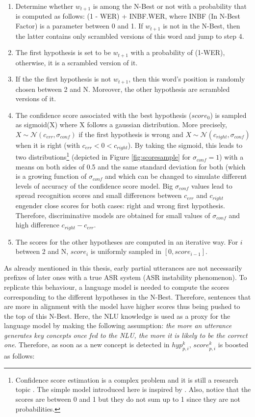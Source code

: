 					\begin{enumerate}
						\item Determine whether $w_{t+1}$ is among the N-Best or not with a probability that is computed as follows: (1 - WER) + INBF.WER, where INBF (In N-Best Factor) is a parameter between 0 and 1. If $w_{t+1}$ is not in the N-Best, then the latter contains only scrambled versions of this word and jump to step 4.
							\item The first hypothesis is set to be $w_{t+1}$ with a probability of (1-WER), otherwise, it is a scrambled version of it.
							\item If the the first hypothesis is not $w_{t+1}$, then this word's position is randomly chosen between 2 and N. Moreover, the other hypothesis are scrambled versions of it.
							\item The confidence score associated with the best hypothesis ($score_0$) is sampled as sigmoid(X) where X follows a gaussian distribution. More precisely,\\$X \sim \mathcal{N} (c_{err},\sigma_{conf})$ if the first hypothesis is wrong and $X \sim \mathcal{N} (c_{right},\sigma_{conf})$ when it is right (with $c_{err} < 0 < c_{right}$). By taking the sigmoid, this leads to two distributions\footnote{Confidence score estimation is a complex problem and it is still a research topic \cite{Jiang2005,Seigel2011}. The simple model introduced here is inspired by \cite{Pietquin2005}. Also, notice that the scores are between 0 and 1 but they do not sum up to 1 since they are not probabilities.} (depicted in Figure \ref{fig:scoresample} for $\sigma_{conf} = 1$) with a means on both sides of 0.5 and the same standard deviation for both (which is a growing function of $\sigma_{conf}$ and which can be changed to simulate different levels of accuracy of the confidence score model. Big $\sigma_{conf}$ values lead to spread recognition scores and small differences between $c_{err}$ and $c_{right}$ engender close scores for both cases: right and wrong first hypothesis. Therefore, discriminative models are obtained for small values of $\sigma_{conf}$ and high difference $c_{right}-c_{err}$.
							\item The scores for the other hypotheses are computed in an iterative way. For $i$ between 2 and N, $score_i$ is uniformly sampled in $[0,score_{i-1}]$.
					\end{enumerate}
					
					As already mentioned in this thesis, early partial utterances are not necessarily prefixes of later ones with a true ASR system (ASR instability phenomenon). To replicate this behaviour, a language model is needed to compute the scores corresponding to the different hypotheses in the N-Best. Therefore, sentences that are more in alignment with the model have higher scores thus being pushed to the top of this N-Best. Here, the NLU knowledge is used as a proxy for the language model by making the following assumption: \textit{the more an utterance generates key concepts once fed to the NLU, the more it is likely to be the correct one}. Therefore, as soon as a new concept is detected in $hyp^k_{p,i}$, $score^k_{p,i}$ is boosted as follows:
					
